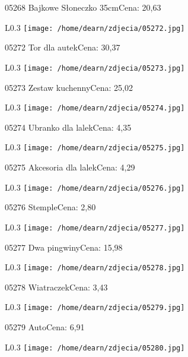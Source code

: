 05268 Bajkowe Słoneczko 35cmCena: 20,63\newline
\begin{wrapfigure}{L}{0.3\textwidth}
\texttt{[image: /home/dearn/zdjecia/05272.jpg]}
\end{wrapfigure}
05272 Tor dla autekCena: 30,37\newline
\begin{wrapfigure}{L}{0.3\textwidth}
\texttt{[image: /home/dearn/zdjecia/05273.jpg]}
\end{wrapfigure}
05273 Zestaw kuchennyCena: 25,02\newline
\begin{wrapfigure}{L}{0.3\textwidth}
\texttt{[image: /home/dearn/zdjecia/05274.jpg]}
\end{wrapfigure}
05274 Ubranko dla lalekCena: 4,35\newline
\begin{wrapfigure}{L}{0.3\textwidth}
\texttt{[image: /home/dearn/zdjecia/05275.jpg]}
\end{wrapfigure}
05275 Akcesoria dla lalekCena: 4,29\newline
\begin{wrapfigure}{L}{0.3\textwidth}
\texttt{[image: /home/dearn/zdjecia/05276.jpg]}
\end{wrapfigure}
05276 StempleCena: 2,80\newline
\begin{wrapfigure}{L}{0.3\textwidth}
\texttt{[image: /home/dearn/zdjecia/05277.jpg]}
\end{wrapfigure}
05277 Dwa pingwinyCena: 15,98\newline
\begin{wrapfigure}{L}{0.3\textwidth}
\texttt{[image: /home/dearn/zdjecia/05278.jpg]}
\end{wrapfigure}
05278 WiatraczekCena: 3,43\newline
\begin{wrapfigure}{L}{0.3\textwidth}
\texttt{[image: /home/dearn/zdjecia/05279.jpg]}
\end{wrapfigure}
05279 AutoCena: 6,91\newline
\begin{wrapfigure}{L}{0.3\textwidth}
\texttt{[image: /home/dearn/zdjecia/05280.jpg]}
\end{wrapfigure}
